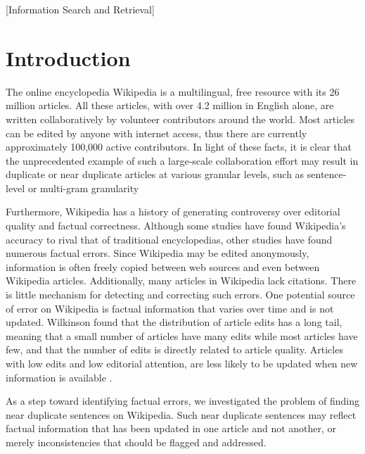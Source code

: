 \documentclass{acm_proc_article-sp}
\begin{document}
[Information Search and Retrieval]


\section{Introduction}
The online encyclopedia Wikipedia is a multilingual, free resource with its 26 million articles. All these articles, with over 4.2 million in English alone, are written collaboratively by volunteer contributors around the world. Most articles can be edited by anyone with internet access, thus there are currently approximately 100,000 active contributors. In light of these facts, it is clear that the unprecedented example of such a large-scale collaboration effort may result in duplicate or near duplicate articles at various granular levels, such as sentence-level or multi-gram granularity \cite{wiki:weblink}

Furthermore, Wikipedia has a history of generating controversy over editorial quality and factual correctness. Although some studies have found Wikipedia’s accuracy to rival that of traditional encyclopedias, other studies have found numerous factual errors. Since Wikipedia may be edited anonymously, information is often freely copied between web sources and even between Wikipedia articles. Additionally, many articles in Wikipedia lack citations. There is little mechanism for detecting and correcting such errors. One potential source of error on Wikipedia is factual information that varies over time and is not updated. Wilkinson found that the distribution of article edits has a long tail, meaning that a small number of articles have many edits while most articles have few, and that the number of edits is directly related to article quality. Articles with low edits and low editorial attention, are less likely to be updated when new information is available \cite{wilkinson:wiki}.

As a step toward identifying factual errors, we investigated the problem of finding near duplicate sentences on Wikipedia. Such near duplicate sentences may reflect factual information that has been updated in one article and not another, or merely inconsistencies that should be flagged and addressed. 
\end{document}
